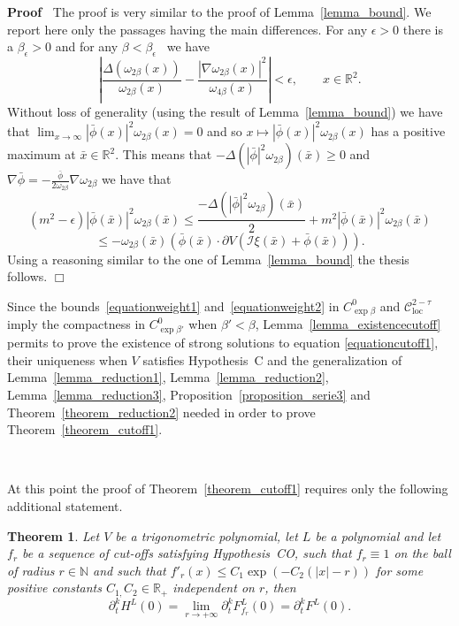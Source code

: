 \documentclass[a4paper,10pt]{article}
\newcommand{\tmop}[1]{\ensuremath{\operatorname{#1}}}
\newenvironment{proof}{\noindent\textbf{Proof\ }}{\hspace*{\fill}$\Box$\medskip}
\newtheorem{theorem}{Theorem}
\begin{document}
\begin{proof}
  The proof is very similar to the proof of Lemma~\ref{lemma_bound}. We report
  here only the passages having the main differences. For any $\epsilon > 0$
  there is a $\beta_{\epsilon} > 0$ and for any $\beta < \beta_{\epsilon}$ \
  we have
  \[ \left| \frac{\Delta (\omega_{2 \beta} (x))}{\omega_{2 \beta} (x)} -
     \frac{| \nabla \omega_{2 \beta} (x) |^2}{\omega_{4 \beta} (x)} \right| <
     \epsilon, \qquad x \in \mathbb{R}^2 . \]
  Without loss of generality (using the result of Lemma~\ref{lemma_bound}) we
  have that $\lim_{x \rightarrow \infty} | \bar{\phi} (x) |^2 \omega_{2 \beta}
  (x) = 0$ and so $x \mapsto | \bar{\phi} (x) |^2 \omega_{2 \beta} (x)$ has a
  positive maximum at $\bar{x} \in \mathbb{R}^2 .$ This means that $- \Delta
  (| \bar{\phi} |^2 \omega_{2 \beta}) (\bar{x}) \geqslant 0$ and $\nabla
  \bar{\phi} = - \frac{\bar{\phi}}{2 \omega_{2 \beta}} \nabla \omega_{2
  \beta}$ we have that
  \[ (m^2 - \epsilon) | \bar{\phi} (\bar{x}) |^2 \omega_{2 \beta} (\bar{x})
     \leqslant \frac{- \Delta (| \bar{\phi} |^2 \omega_{2 \beta})
     (\bar{x})}{2} + m^2 | \bar{\phi} (\bar{x}) |^2 \omega_{2 \beta} (\bar{x})
  \]
  \[ \leqslant - \omega_{2 \beta} (\bar{x}) (\bar{\phi} (\bar{x}) \cdot
     \partial V (\mathcal{I} \xi (\bar{x}) + \bar{\phi} (\bar{x}))) . \]
  Using a reasoning similar to the one of Lemma~\ref{lemma_bound} the thesis
  follows.
\end{proof}

Since the bounds~{\eqref{equationweight1}} and~{\eqref{equationweight2}} in
$C_{\exp \beta}^0$ and $\mathcal{C}^{2 - \tau}_{\tmop{loc}}$ imply the
compactness in $C^0_{\exp \beta'}$ when $\beta' < \beta$,
Lemma~\ref{lemma_existencecutoff} permits to prove the existence of strong
solutions to equation {\eqref{equationcutoff1}}, their uniqueness when $V$
satisfies Hypothesis~C and the generalization of Lemma~\ref{lemma_reduction1},
Lemma~\ref{lemma_reduction2}, Lemma~\ref{lemma_reduction3},
Proposition~\ref{proposition_serie3} and Theorem~\ref{theorem_reduction2}
needed in order to prove Theorem~\ref{theorem_cutoff1}.

\

At this point the proof of Theorem~\ref{theorem_cutoff1} requires only the
following additional statement.

\begin{theorem}
  \label{theorem_gaussian1}Let $V$ be a trigonometric polynomial, let $L$ be a
  polynomial and let $f_r$ be a sequence of cut-offs satisfying Hypothesis~CO,
  such that $f_r \equiv 1$ on the ball of radius $r \in \mathbb{N}$ and such
  that $f'_r (x) \leqslant C_1 \exp (- C_2 (| x | - r))$ for some positive
  constants $C_{1,} C_2 \in \mathbb{R}_+$ independent on $r$, then
  \[ \partial_t^k H^L (0) = \lim_{r \rightarrow + \infty} \partial^k_t
     F^L_{f_r} (0) = \partial^k_t F^L (0) . \]
\end{theorem}
\end{document}
